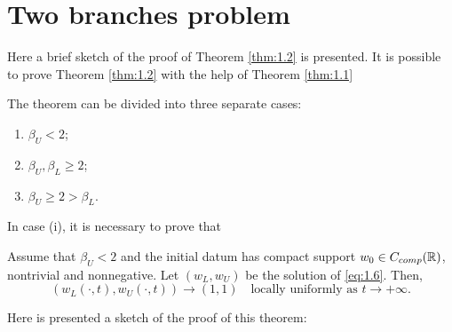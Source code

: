 \section{Two branches problem} 
Here a brief sketch of the proof of Theorem \ref{thm:1.2} is presented. It is possible to prove Theorem \ref{thm:1.2} with the help of Theorem \ref{thm:1.1}

The theorem can be divided into three separate cases:
\begin{enumerate}[label=(\roman*)]
    \item \(\beta_U < 2\);
    \item \(\beta_U, \beta_L \geq 2\);
    \item \(\beta_U \geq 2 > \beta_L\).
\end{enumerate}
In case (i), it is necessary to prove that
\begin{theorem}
    Assume that \(\beta_U < 2\) and the initial datum has compact support \(w_{0} \in C_{comp}(\mathbb{R})\), nontrivial and nonnegative. Let \((w_L, w_{U})\) be the solution of \eqref{eq:1.6}. Then,
    \[
        (w_L(\cdot, t), w_{U}(\cdot, t)) \to (1, 1) \quad \text{locally uniformly as } t \to +\infty.
    \]
    \label{thm:3.1}
\end{theorem}
Here is presented a sketch of the proof of this theorem:
